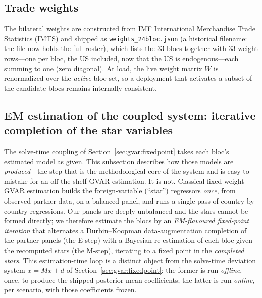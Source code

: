 \documentclass[11pt]{article}
\theoremstyle{definition}
\theoremstyle{remark}
\begin{document}
\subsection{Trade weights}\label{sec:gvar:weights}

The bilateral weights are constructed from IMF International Merchandise Trade
Statistics (IMTS) and shipped as \texttt{weights\_24bloc.json} (a historical
filename: the file now holds the full roster), which lists the $33$ blocs
together with $33$ weight rows---one per bloc, the US included, now that the US
is endogenous---each summing to one (zero diagonal).
At load, the live weight matrix $W$ is renormalized over the \emph{active} bloc
set, so a deployment that activates a subset of the candidate blocs remains
internally consistent.

\subsection{EM estimation of the coupled system: iterative completion of the
star variables}\label{sec:gvar:em}

The solve-time coupling of Section~\ref{sec:gvar:fixedpoint} takes each bloc's
estimated model as given. This subsection describes how those models are
\emph{produced}---the step that is the methodological core of the system and is
easy to mistake for an off-the-shelf GVAR estimation. It is not. Classical
fixed-weight GVAR estimation builds the foreign-variable (``star'') regressors
\emph{once}, from observed partner data, on a balanced panel, and runs a single
pass of country-by-country regressions. Our panels are deeply unbalanced and the
stars cannot be formed directly; we therefore estimate the blocs by an
\emph{EM-flavoured fixed-point iteration} that alternates a Durbin--Koopman
data-augmentation completion of the partner panels (the E-step) with a Bayesian
re-estimation of each bloc given the recomputed stars (the M-step), iterating to
a fixed point in the \emph{completed stars}. This estimation-time loop is a
distinct object from the solve-time deviation system $x = Mx + d$ of
Section~\ref{sec:gvar:fixedpoint}: the former is run \emph{offline}, once, to
produce the shipped posterior-mean coefficients; the latter is run \emph{online},
per scenario, with those coefficients frozen.
\end{document}
